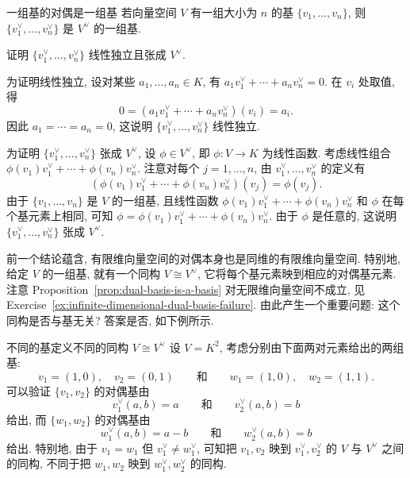 \begin{Proposition}{一组基的对偶是一组基}\leavevmode\label{prop:dual-basis-is-a-basis}
若向量空间 $V$ 有一组大小为 $n$ 的基 $\{v_{1},\ldots,v_{n}\}$, 则 $\{v_{1}^{\vee},\ldots,v_{n}^{\vee}\}$ 是 $V^{\vee}$ 的一组基.
\end{Proposition}
\begin{Proof}
证明 $\{v_{1}^{\vee},\ldots,v_{n}^{\vee}\}$ 线性独立且张成 $V^{\vee}$.

为证明线性独立, 设对某些 $a_{1},\ldots,a_{n}\in K$, 有 $a_{1}v_{1}^{\vee}+\cdots+a_{n}v_{n}^{\vee}=0$. 在 $v_{i}$ 处取值, 得
\[
  0=(a_{1}v_{1}^{\vee}+\cdots+a_{n}v_{n}^{\vee})(v_{i})=a_{i}.
\]
因此 $a_{1}=\cdots=a_{n}=0$, 这说明 $\{v_{1}^{\vee},\ldots,v_{n}^{\vee}\}$ 线性独立.

为证明 $\{v_{1}^{\vee},\ldots,v_{n}^{\vee}\}$ 张成 $V^{\vee}$, 设 $\phi\in V^{\vee}$, 即 $\phi:V\to K$ 为线性函数. 考虑线性组合 $\phi(v_{1})v_{1}^{\vee}+\cdots+\phi(v_{n})v_{n}^{\vee}$. 注意对每个 $j=1,\ldots,n$, 由 $v_{1}^{\vee},\ldots,v_{n}^{\vee}$ 的定义有
\[
  (\phi(v_{1})v_{1}^{\vee}+\cdots+\phi(v_{n})v_{n}^{\vee})(v_{j})=\phi(v_{j}).
\]
由于 $\{v_{1},\ldots,v_{n}\}$ 是 $V$ 的一组基, 且线性函数 $\phi(v_{1})v_{1}^{\vee}+\cdots+\phi(v_{n})v_{n}^{\vee}$ 和 $\phi$ 在每个基元素上相同, 可知 $\phi=\phi(v_{1})v_{1}^{\vee}+\cdots+\phi(v_{n})v_{n}^{\vee}$. 由于 $\phi$ 是任意的, 这说明 $\{v_{1}^{\vee},\ldots,v_{n}^{\vee}\}$ 张成 $V^{\vee}$.
\end{Proof}

\BookPairedNote
  {前一个结论蕴含, 有限维向量空间的对偶本身也是同维的有限维向量空间. 特别地, 给定 $V$ 的一组基, 就有一个同构 $V\cong V^{\vee}$, 它将每个基元素映到相应的对偶基元素.}
  {注意 Proposition~\ref{prop:dual-basis-is-a-basis} 对无限维向量空间不成立, 见 Exercise~\ref{ex:infinite-dimensional-dual-basis-failure}.}
由此产生一个重要问题: 这个同构是否与基无关? 答案是\textquotedbl{}否\textquotedbl{}, 如下例所示.

\begin{Example}{不同的基定义不同的同构 $V\cong V^{\vee}$}\leavevmode\label{ex:duality-isomorphisms-depend-on-basis}
设 $V=K^{2}$, 考虑分别由下面两对元素给出的两组基:
\[
  v_{1}=(1,0),\quad v_{2}=(0,1)
  \qquad\text{和}\qquad
  w_{1}=(1,0),\quad w_{2}=(1,1).
\]
可以验证 $\{v_{1},v_{2}\}$ 的对偶基由
\[
  v_{1}^{\vee}(a,b)=a\qquad\text{和}\qquad v_{2}^{\vee}(a,b)=b
\]
给出, 而 $\{w_{1},w_{2}\}$ 的对偶基由
\[
  w_{1}^{\vee}(a,b)=a-b\qquad\text{和}\qquad w_{2}^{\vee}(a,b)=b
\]
给出. 特别地, 由于 $v_{1}=w_{1}$ 但 $v_{1}^{\vee}\neq w_{1}^{\vee}$, 可知把 $v_{1},v_{2}$ 映到 $v_{1}^{\vee},v_{2}^{\vee}$ 的 $V$ 与 $V^{\vee}$ 之间的同构, 不同于把 $w_{1},w_{2}$ 映到 $w_{1}^{\vee},w_{2}^{\vee}$ 的同构.
\end{Example}

